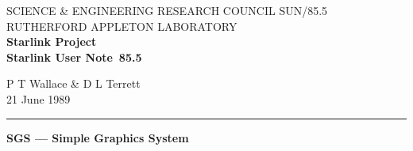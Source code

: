 \pagestyle{myheadings}

\newcommand{\stardoccategory}  {Starlink User Note}
\newcommand{\stardocinitials}  {SUN}
\newcommand{\stardocnumber}    {85.5}
\newcommand{\stardocauthors}   {P T Wallace \& D L Terrett}
\newcommand{\stardocdate}      {21 June 1989}
\newcommand{\stardoctitle}     {SGS --- Simple Graphics System}

\newcommand{\stardocname}{\stardocinitials /\stardocnumber}
\markright{\stardocname}
\setlength{\textwidth}{160mm}
\setlength{\textheight}{240mm}
\setlength{\topmargin}{-5mm}
\setlength{\oddsidemargin}{0mm}
\setlength{\evensidemargin}{0mm}
\setlength{\parindent}{0mm}
\setlength{\parskip}{\medskipamount}
\setlength{\unitlength}{1mm}
  
\renewcommand{\_}{{\tt\char'137}}
\newcommand{\routinehead}[1]{\vspace{\bigskipamount}{\large\bf#1}}
\newenvironment{routinelist}{\begin{list}{}{\setlength{\leftmargin}{2cm}
                             \setlength{\parsep}{\smallskipamount}}}{\end{list}}
\newcommand{\routine}[1]{\item\hspace{-1cm}#1\\}


\newenvironment{params}%
{\[\begin{tabular}{p{0.14\textwidth}p{0.05\textwidth}p{0.66\textwidth}}}%
{\end{tabular}\]}


\thispagestyle{empty}
SCIENCE \& ENGINEERING RESEARCH COUNCIL \hfill \stardocname\\
RUTHERFORD APPLETON LABORATORY\\
{\large\bf Starlink Project\\}
{\large\bf \stardoccategory\ \stardocnumber}
\begin{flushright}
\stardocauthors\\
\stardocdate
\end{flushright}
\vspace{-4mm}
\rule{\textwidth}{0.5mm}
\vspace{2mm}
\begin{center}
{\Large\bf \stardoctitle}
\end{center}
\vspace{2mm}


